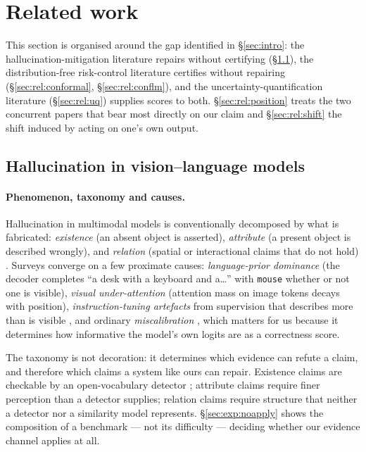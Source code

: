 \documentclass{article}
\theoremstyle{plain}
\theoremstyle{definition}
\theoremstyle{remark}
\begin{document}
\section{Related work}
\label{sec:related}

This section is organised around the gap identified in \S\ref{sec:intro}: the
hallucination-mitigation literature repairs without certifying (\S\ref{sec:rel:hallu}), the
distribution-free risk-control literature certifies without repairing
(\S\ref{sec:rel:conformal}, \S\ref{sec:rel:conflm}), and the uncertainty-quantification
literature (\S\ref{sec:rel:uq}) supplies scores to both. \S\ref{sec:rel:position} treats the
two concurrent papers that bear most directly on our claim and \S\ref{sec:rel:shift} the
shift induced by acting on one's own output.

\subsection{Hallucination in vision--language models}
\label{sec:rel:hallu}

\paragraph{Phenomenon, taxonomy and causes.}
Hallucination in multimodal models is conventionally decomposed by what is fabricated:
\emph{existence} (an absent object is asserted), \emph{attribute} (a present object is
described wrongly), and \emph{relation} (spatial or interactional claims that do not hold)
\citep{amber}. Surveys \citep{bai2024survey,liu2024survey,ji2023} converge on a few proximate
causes: \emph{language-prior dominance} (the decoder completes ``a desk with a keyboard
and a\dots'' with \texttt{mouse} whether or not one is visible), \emph{visual
under-attention} (attention mass on image tokens decays with position), \emph{instruction-tuning
artefacts} from supervision that describes more than is visible \citep{liu2023lrv}, and
ordinary \emph{miscalibration} \citep{guo2017}, which matters for us because it determines how
informative the model's own logits are as a correctness score.

The taxonomy is not decoration: it determines which evidence can refute a claim, and
therefore which claims a system like ours can repair. Existence claims are checkable by an
open-vocabulary detector \citep{owlv2,liu2024groundingdino}; attribute claims require finer
perception than a detector supplies; relation claims require structure that neither a detector
nor a similarity model represents. \S\ref{sec:exp:noapply} shows the composition of a
benchmark --- not its difficulty --- deciding whether our evidence channel applies at all.
\end{document}
